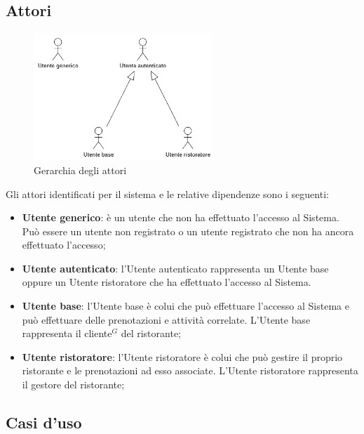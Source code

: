 \newpage
\subsection{Attori}

\begin{figure}[h]
	\centering
	\includegraphics[width=0.6\textwidth]{./uml/gerarchia_attori.png}
	\caption{Gerarchia degli attori}
\end{figure}

Gli attori identificati per il sistema e le relative dipendenze sono i seguenti:
\begin{itemize}
	\item \textbf{Utente generico}: è un utente che non ha effettuato l'accesso al
	      Sistema. Può essere un utente non registrato o un utente registrato che non ha
	      ancora effettuato l'accesso;

	\item \textbf{Utente autenticato}: l'Utente autenticato rappresenta un Utente
	      base oppure un Utente ristoratore che ha effettuato l'accesso al Sistema.

	\item \textbf{Utente base}: l'Utente base è colui che può effettuare l'accesso al Sistema e può
	      effettuare delle prenotazioni e attività correlate. L'Utente base rappresenta
	      il cliente$^G$ del ristorante;

	\item \textbf{Utente ristoratore}: l'Utente ristoratore è colui che può gestire il proprio ristorante e le
	      prenotazioni ad esso associate. L'Utente ristoratore rappresenta il gestore del
	      ristorante;
\end{itemize}

\newpage
\subsection{Casi d'uso}

